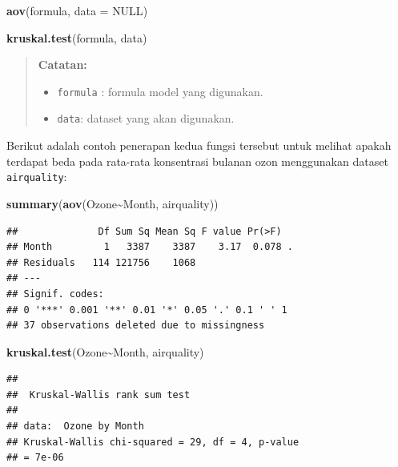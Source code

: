 \documentclass[
]{book}
\newenvironment{Shaded}{\begin{snugshade}}{\end{snugshade}}
\newcommand{\AttributeTok}[1]{\textcolor[rgb]{0.13,0.29,0.53}{#1}}
\newcommand{\ConstantTok}[1]{\textcolor[rgb]{0.56,0.35,0.01}{#1}}
\newcommand{\FunctionTok}[1]{\textcolor[rgb]{0.13,0.29,0.53}{\textbf{#1}}}
\newcommand{\NormalTok}[1]{#1}
\newcommand{\SpecialCharTok}[1]{\textcolor[rgb]{0.81,0.36,0.00}{\textbf{#1}}}
\providecommand{\tightlist}{%
  \setlength{\itemsep}{0pt}\setlength{\parskip}{0pt}}
\theoremstyle{definition}
\theoremstyle{definition}
\theoremstyle{definition}
\theoremstyle{definition}
\theoremstyle{remark}
\begin{document}
\begin{Shaded}
\begin{Highlighting}[]
\FunctionTok{aov}\NormalTok{(formula, }\AttributeTok{data =} \ConstantTok{NULL}\NormalTok{)}

\FunctionTok{kruskal.test}\NormalTok{(formula, data)}
\end{Highlighting}
\end{Shaded}

\begin{quote}
\textbf{Catatan:}

\begin{itemize}
\tightlist
\item
  \texttt{formula} : formula model yang digunakan.
\item
  \texttt{data}: dataset yang akan digunakan.
\end{itemize}
\end{quote}

Berikut adalah contoh penerapan kedua fungsi tersebut untuk melihat apakah terdapat beda pada rata-rata konsentrasi bulanan ozon menggunakan dataset \texttt{airquality}:

\begin{Shaded}
\begin{Highlighting}[]
\FunctionTok{summary}\NormalTok{(}\FunctionTok{aov}\NormalTok{(Ozone}\SpecialCharTok{\textasciitilde{}}\NormalTok{Month, airquality))}
\end{Highlighting}
\end{Shaded}

\begin{verbatim}
##              Df Sum Sq Mean Sq F value Pr(>F)  
## Month         1   3387    3387    3.17  0.078 .
## Residuals   114 121756    1068                 
## ---
## Signif. codes:  
## 0 '***' 0.001 '**' 0.01 '*' 0.05 '.' 0.1 ' ' 1
## 37 observations deleted due to missingness
\end{verbatim}

\begin{Shaded}
\begin{Highlighting}[]
\FunctionTok{kruskal.test}\NormalTok{(Ozone}\SpecialCharTok{\textasciitilde{}}\NormalTok{Month, airquality)}
\end{Highlighting}
\end{Shaded}

\begin{verbatim}
## 
##  Kruskal-Wallis rank sum test
## 
## data:  Ozone by Month
## Kruskal-Wallis chi-squared = 29, df = 4, p-value
## = 7e-06
\end{verbatim}
\end{document}
